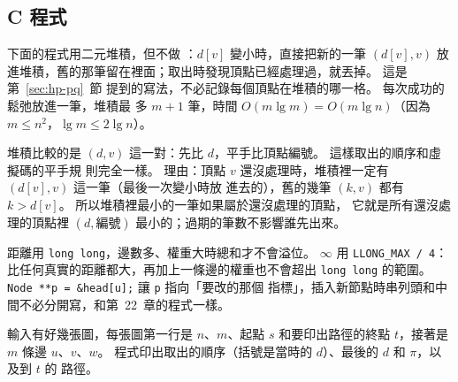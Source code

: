 \subsection{C 程式}

下面的程式用二元堆積，但不做 ：$d[v]$ 變小時，直接把新的一筆
$(d[v], v)$ 放進堆積，舊的那筆留在裡面；取出時發現頂點已經處理過，就丟掉。 這是第~\ref{sec:hp-pq}~節
提到的寫法，不必記錄每個頂點在堆積的哪一格。 每次成功的鬆弛放進一筆，堆積最
多 $m + 1$ 筆，時間 $O(m \lg m) = O(m \lg n)$（因為 $m \le n^2$，$\lg m \le 2 \lg n$）。

堆積比較的是 $(d, v)$ 這一對：先比 $d$，平手比頂點編號。 這樣取出的順序和虛擬碼的平手規
則完全一樣。 理由：頂點 $v$ 還沒處理時，堆積裡一定有 $(d[v], v)$ 這一筆（最後一次變小時放
進去的），舊的幾筆 $(k, v)$ 都有 $k > d[v]$。 所以堆積裡最小的一筆如果屬於還沒處理的頂點，
它就是所有還沒處理的頂點裡 $(d, \text{編號})$ 最小的；過期的筆數不影響誰先出來。

\begin{cbookrecap}[第~13~章 13.1 節、第~19~章 19.10 節]
距離用 \texttt{long long}，邊數多、權重大時總和才不會溢位。 $\infty$ 用
\texttt{LLONG\_MAX / 4}：比任何真實的距離都大，再加上一條邊的權重也不會超出
\texttt{long long} 的範圍。 \texttt{Node **p = \&head[u];} 讓 \texttt{p} 指向「要改的那個
指標」，插入新節點時串列頭和中間不必分開寫，和第~22~章的程式一樣。
\end{cbookrecap}

輸入有好幾張圖，每張圖第一行是 $n$、$m$、起點 $s$ 和要印出路徑的終點 $t$，接著是 $m$ 條邊
$u$、$v$、$w$。 程式印出取出的順序（括號是當時的 $d$）、最後的 $d$ 和 $\pi$，以及到 $t$ 的
路徑。


